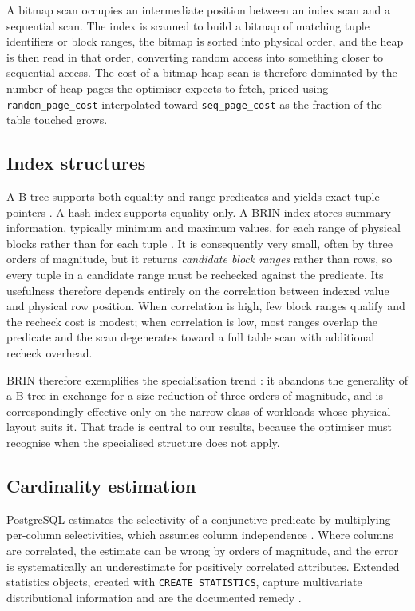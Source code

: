 \documentclass[preprint,12pt,authoryear]{elsarticle}
\newcommand{\rpc}{\texttt{random\_page\_cost}}
\begin{document}
A bitmap scan occupies an intermediate position between an index scan
and a sequential scan. The index is scanned to build a bitmap of
matching tuple identifiers or block ranges, the bitmap is sorted into
physical order, and the heap is then read in that order, converting
random access into something closer to sequential access. The cost of a
bitmap heap scan is therefore dominated by the number of heap pages the
optimiser expects to fetch, priced using \rpc{} interpolated toward
\texttt{seq\_page\_cost} as the fraction of the table touched grows.

\subsection{Index structures}

A B-tree supports both equality and range predicates and yields exact
tuple pointers \citep{comer1979ubiquitous,graefe2011modern,silberschatz2019database}. A hash
index supports equality only. A BRIN index stores summary information,
typically minimum and maximum values, for each range of physical blocks
rather than for each tuple \citep{pgdocs17brin}. It is consequently very
small, often by three orders of magnitude, but it returns \emph{candidate
block ranges} rather than rows, so every tuple in a candidate range must
be rechecked against the predicate. Its usefulness therefore depends
entirely on the correlation between indexed value and physical row
position. When correlation is high, few block ranges qualify and the
recheck cost is modest; when correlation is low, most ranges overlap the
predicate and the scan degenerates toward a full table scan with
additional recheck overhead.

BRIN therefore exemplifies the specialisation trend \citep{stonebraker2005goes}:
it abandons the generality of a B-tree in exchange for a size reduction of
three orders of magnitude, and is correspondingly effective only on the
narrow class of workloads whose physical layout suits it. That trade is
central to our results, because the optimiser must recognise when the
specialised structure does not apply.

\subsection{Cardinality estimation}

PostgreSQL estimates the selectivity of a conjunctive predicate by
multiplying per-column selectivities, which assumes column independence
\citep{pgdocs17planner}. Where columns are correlated, the estimate can
be wrong by orders of magnitude, and the error is systematically an
underestimate for positively correlated attributes. Extended statistics
objects, created with \texttt{CREATE STATISTICS}, capture multivariate
distributional information and are the documented remedy
\citep{pgdocs17createstats}.
\end{document}
